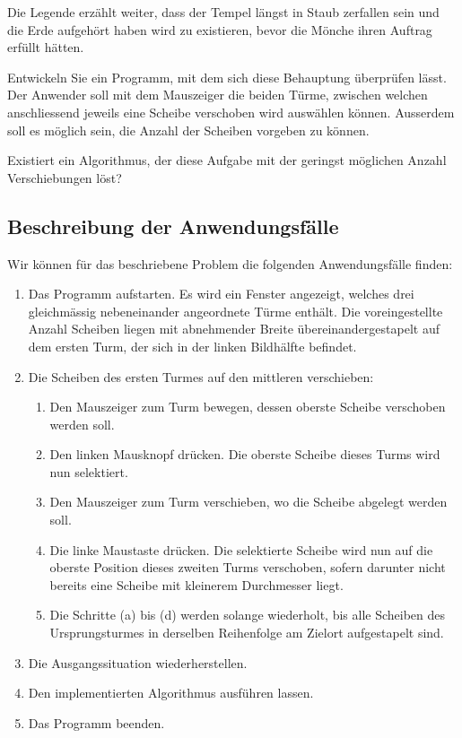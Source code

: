 Die Legende erzählt weiter, dass der Tempel längst in Staub zerfallen sein und die Erde
aufgehört haben wird zu existieren, bevor die Mönche ihren Auftrag erfüllt hätten.

Entwickeln Sie ein Programm, mit dem sich diese Behauptung überprüfen lässt. 
Der Anwender soll mit dem Mauszeiger die beiden Türme, zwischen welchen anschliessend 
jeweils eine Scheibe verschoben wird auswählen können. 
Ausserdem soll es möglich sein, die Anzahl der Scheiben vorgeben zu können.

Existiert ein Algorithmus, der diese Aufgabe mit der geringst 
möglichen Anzahl Verschiebungen löst?
\subsection{Beschreibung der Anwendungsfälle}
Wir können für das beschriebene Problem die folgenden Anwendungsfälle finden:
\begin{enumerate}
\item Das Programm aufstarten. Es wird ein Fenster angezeigt, welches drei
     gleich\-mässig nebeneinander angeordnete Türme enthält. Die voreingestellte Anzahl 
     Scheiben liegen mit abnehmender Breite übereinandergestapelt auf dem
     ersten Turm, der sich in der linken Bildhälfte befindet.
\item Die Scheiben des ersten Turmes auf den mittleren verschieben:
  \begin{enumerate}
   \item  Den Mauszeiger zum Turm bewegen, dessen oberste Scheibe verschoben werden
        soll.
   \item  Den linken Mausknopf drücken. Die oberste Scheibe dieses Turms
               wird nun selektiert.
   \item Den Mauszeiger zum Turm verschieben, wo die Scheibe abgelegt werden soll.
   \item Die linke Maustaste drücken. Die selektierte Scheibe wird nun auf
      die oberste Position dieses zweiten Turms verschoben, sofern darunter
      nicht bereits eine Scheibe mit kleinerem Durchmesser liegt.
   \item Die Schritte (a) bis (d) werden solange wiederholt, bis
       alle Scheiben des Ursprungsturmes in derselben Reihenfolge 
       am Zielort aufgestapelt sind.
  \end{enumerate}
\item Die Ausgangssituation wiederherstellen.
\item Den implementierten Algorithmus ausführen lassen.
\item Das Programm beenden.
\end{enumerate}
\newpage
